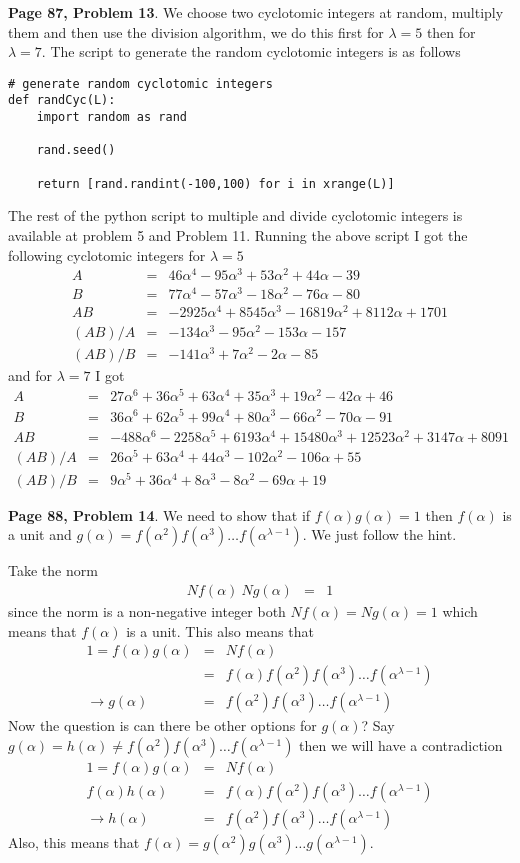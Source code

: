 \documentclass[aps,preprint,preprintnumbers,nofootinbib,showpacs,prd]{revtex4-1}
\newcommand{\nbea}{\begin{eqnarray*}}
\newcommand{\neea}{\end{eqnarray*}}
\begin{document}
{\bf Page 87, Problem 13}. We choose two cyclotomic integers at random, multiply them and then use the division algorithm, we do this first for $\lambda = 5$ then for $\lambda = 7$. The script to generate the random cyclotomic integers is as follows
%
\begin{Verbatim}[baselinestretch=0.75]
# generate random cyclotomic integers
def randCyc(L):
    import random as rand

    rand.seed()

    return [rand.randint(-100,100) for i in xrange(L)]
\end{Verbatim}
%
The rest of the python script to multiple and divide cyclotomic integers is available at problem 5 and Problem 11. Running the above script I got the following cyclotomic integers for $\lambda = 5$
%
\nbea
A & = & 46\alpha^4 - 95\alpha^3 + 53\alpha^2 + 44\alpha - 39 \\
B & = & 77\alpha^4 - 57\alpha^3 - 18\alpha^2 - 76\alpha - 80 \\
AB & = & -2925\alpha^4 + 8545\alpha^3 - 16819\alpha^2 + 8112\alpha + 1701 \\
(AB)/A & = & -134\alpha^3 - 95\alpha^2 - 153\alpha - 157 \\
(AB)/B & = & -141\alpha^3 + 7\alpha^2 -2\alpha - 85
\neea
%
and for $\lambda = 7$ I got
%
\nbea
A & = & 27\alpha^6 + 36\alpha^5 + 63\alpha^4 + 35\alpha^3 + 19 \alpha^2 - 42 \alpha +46 \\
B & = & 36\alpha^6 + 62\alpha^5 + 99\alpha^4 + 80\alpha^3 - 66\alpha^2 - 70\alpha - 91 \\
AB & = & -488\alpha^6 - 2258\alpha^5 + 6193\alpha^4 + 15480\alpha^3 + 12523\alpha^2 + 3147\alpha + 8091 \\
(AB)/A & = & 26\alpha^5 + 63\alpha^4 + 44\alpha^3 - 102\alpha^2 - 106\alpha + 55 \\
(AB)/B & = & 9\alpha^5 + 36\alpha^4 + 8\alpha^3 - 8\alpha^2 -69\alpha + 19
\neea
%


{\bf Page 88, Problem 14}. We need to show that if $f(\alpha)g(\alpha) = 1$ then $f(\alpha)$ is a unit and $g(\alpha) = f(\alpha^2)f(\alpha^3)\dots f(\alpha^{\lambda-1})$. We just follow the hint.

Take the norm
%
\nbea
Nf(\alpha)~Ng(\alpha) & = & 1
\neea
%
since the norm is a non-negative integer both $Nf(\alpha) = Ng(\alpha) = 1$ which means that $f(\alpha)$ is a unit. This also means that
%
\nbea
1 = f(\alpha)g(\alpha) & = & Nf(\alpha) \\
& = & f(\alpha)f(\alpha^2)f(\alpha^3)\dots f(\alpha^{\lambda-1}) \\
\to g(\alpha) & = & f(\alpha^2)f(\alpha^3)\dots f(\alpha^{\lambda-1})
\neea
%
Now the question is can there be other options for $g(\alpha)$? Say $g(\alpha) = h(\alpha) \neq f(\alpha^2)f(\alpha^3)\dots f(\alpha^{\lambda-1})$ then we will have a contradiction
%
\nbea
1 = f(\alpha)g(\alpha) & = & Nf(\alpha) \\
f(\alpha)h(\alpha) & = & f(\alpha)f(\alpha^2)f(\alpha^3)\dots f(\alpha^{\lambda-1}) \\
\to h(\alpha) & = & f(\alpha^2)f(\alpha^3)\dots f(\alpha^{\lambda-1})
\neea
%
Also, this means that $f(\alpha) = g(\alpha^2)g(\alpha^3)\dots g(\alpha^{\lambda-1})$.
\end{document}
